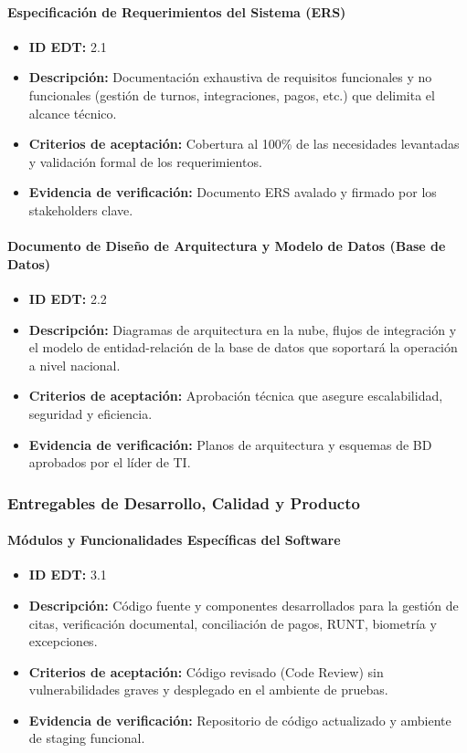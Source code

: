 \paragraph{Especificación de Requerimientos del Sistema (ERS)}
\begin{itemize}
    \item \textbf{ID EDT:} 2.1
    \item \textbf{Descripción:} Documentación exhaustiva de requisitos funcionales y no funcionales (gestión de turnos, integraciones, pagos, etc.) que delimita el alcance técnico.
    \item \textbf{Criterios de aceptación:} Cobertura al 100\% de las necesidades levantadas y validación formal de los requerimientos.
    \item \textbf{Evidencia de verificación:} Documento ERS avalado y firmado por los stakeholders clave.
\end{itemize}

\paragraph{Documento de Diseño de Arquitectura y Modelo de Datos (Base de Datos)}
\begin{itemize}
    \item \textbf{ID EDT:} 2.2
    \item \textbf{Descripción:} Diagramas de arquitectura en la nube, flujos de integración y el modelo de entidad-relación de la base de datos que soportará la operación a nivel nacional.
    \item \textbf{Criterios de aceptación:} Aprobación técnica que asegure escalabilidad, seguridad y eficiencia.
    \item \textbf{Evidencia de verificación:} Planos de arquitectura y esquemas de BD aprobados por el líder de TI.
\end{itemize}

\subsubsection{Entregables de Desarrollo, Calidad y Producto}

\paragraph{Módulos y Funcionalidades Específicas del Software}
\begin{itemize}
    \item \textbf{ID EDT:} 3.1
    \item \textbf{Descripción:} Código fuente y componentes desarrollados para la gestión de citas, verificación documental, conciliación de pagos, RUNT, biometría y excepciones.
    \item \textbf{Criterios de aceptación:} Código revisado (Code Review) sin vulnerabilidades graves y desplegado en el ambiente de pruebas.
    \item \textbf{Evidencia de verificación:} Repositorio de código actualizado y ambiente de staging funcional.
\end{itemize}

